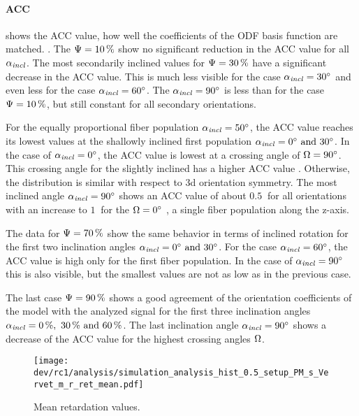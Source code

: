 \paragraph{\acs{ACC}}
 shows the  \ac{ACC} value, \ie{} how well the coefficients of the \ac{ODF} basis function are matched.
.
The $\textnormal{$\Psi$}=\SI{10}{\percent}$ show no significant reduction in the \ac{ACC} value for all $\textnormal{$\alpha_{\mathit{incl}}$}$.
The most secondarily inclined values for $\textnormal{$\Psi$}=\SI{30}{\percent}$ have a significant decrease in the \ac{ACC} value.
This is much less visible for the case $\textnormal{$\alpha_{\mathit{incl}}$} = \SI{30}{\degree}$ and even less for the case $\textnormal{$\alpha_{\mathit{incl}}$} = \SI{60}{\degree}$.
The $\textnormal{$\alpha_{\mathit{incl}}$} = \SI{90}{\degree}$ is less than for the case $\textnormal{$\Psi$}=\SI{10}{\percent}$, but still constant for all secondary orientations.
\par
%
For the equally proportional fiber population $\textnormal{$\alpha_{\mathit{incl}}$} = \SI{50}{\degree}$, the \ac{ACC} value reaches its lowest values at the shallowly inclined first population $\modelInc = \SIlist{0;30}{\degree}$.
In the case of $\textnormal{$\alpha_{\mathit{incl}}$} = \SI{0}{\degree}$, the \ac{ACC} value is lowest at a crossing angle of $\textnormal{$\Omega$} = \SI{90}{\degree}$.
This crossing angle for the slightly inclined has a higher \ac{ACC} value .
Otherwise, the distribution is similar with respect to 3d orientation symmetry.
The most inclined angle $\textnormal{$\alpha_{\mathit{incl}}$}=\SI{90}{\degree}$ shows an \ac{ACC} value of about $\SI{0.5}{}$ for all orientations with an increase to $\SI{1}{}$ for the $\textnormal{$\Omega$} = \SI{0}{\degree}$ ,\ie{} a single fiber population along the z-axis.
\par
%
The data for $\textnormal{$\Psi$}=\SI{70}{\percent}$ show the same behavior in terms of inclined rotation for the first two inclination angles $\modelInc = \SIlist{0;30}{\degree}$.
For the case $\textnormal{$\alpha_{\mathit{incl}}$}=\SI{60}{\degree}$, the \ac{ACC} value is high only for the first fiber population.
In the case of $\textnormal{$\alpha_{\mathit{incl}}$}=\SI{90}{\degree}$ this is also visible, but the smallest values are not as low as in the previous case.
\par
%
The last case $\textnormal{$\Psi$}=\SI{90}{\percent}$ shows a good agreement of the orientation coefficients of the model with the analyzed signal for the first three inclination angles $\modelInc=\SIlist{0;30;60}{\percent}$.
The last inclination angle $\textnormal{$\alpha_{\mathit{incl}}$}=\SI{90}{\degree}$ shows a decrease of the \ac{ACC} value for the highest crossing angles $\textnormal{$\Omega$}$.
%
%
%
\begin{figure}[!p]
\centering
\texttt{[image: dev/rc1/analysis/simulation\_analysis\_hist\_0.5\_setup\_PM\_s\_Vervet\_m\_r\_ret\_mean.pdf]}
\caption{Mean retardation values. }
\label{fig:sim_ana_ret}
\end{figure}
%
